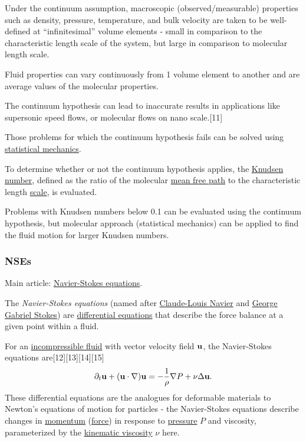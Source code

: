 \documentclass{article}
\begin{document}
Under the continuum assumption, macroscopic (observed/measurable) properties such as density, pressure, temperature, and bulk velocity are taken to be well-defined at ``infinitesimal'' volume elements - small in comparison to the characteristic length scale of the system, but large in comparison to molecular length scale.

Fluid properties can vary continuously from 1 volume element to another and are average values of the molecular properties.

The continuum hypothesis can lead to inaccurate results in applications like supersonic speed flows, or molecular flows on nano scale.[11]

Those problems for which the continuum hypothesis fails can be solved using \href{https://en.wikipedia.org/wiki/Statistical_mechanics}{statistical mechanics}.

To determine whether or not the continuum hypothesis applies, the \href{https://en.wikipedia.org/wiki/Knudsen_number}{Knudsen number}, defined as the ratio of the molecular \href{https://en.wikipedia.org/wiki/Mean_free_path}{mean free path} to the characteristic length \href{https://en.wikipedia.org/wiki/Scale_(ratio)}{scale}, is evaluated.

Problems with Knudsen numbers below 0.1 can be evaluated using the continuum hypothesis, but molecular approach (statistical mechanics) can be applied to find the fluid motion for larger Knudsen numbers.

\subsubsection{NSEs}
Main article: \href{https://en.wikipedia.org/wiki/Navier-Stokes_equations}{Navier-Stokes equations}.

%
The \textit{Navier-Stokes equations} (named after \href{https://en.wikipedia.org/wiki/Claude-Louis_Navier}{Claude-Louis Navier} and \href{https://en.wikipedia.org/wiki/George_Gabriel_Stokes}{George Gabriel Stokes}) are \href{https://en.wikipedia.org/wiki/Differential_equations}{differential equations} that describe the force balance at a given point within a fluid.

For an \href{https://en.wikipedia.org/wiki/Incompressible_fluid}{incompressible fluid} with vector velocity field ${\bf u}$, the Navier-Stokes equations are[12][13][14][15]
\begin{align*}
	\partial_t{\bf u} + ({\bf u}\cdot\nabla){\bf u} = -\frac{1}{\rho}\nabla P + \nu\Delta{\bf u}.
\end{align*}
These differential equations are the analogues for deformable materials to Newton's equations of motion for particles - the Navier-Stokes equations describe changes in \href{https://en.wikipedia.org/wiki/Momentum}{momentum} (\href{https://en.wikipedia.org/wiki/Force}{force}) in response to \href{https://en.wikipedia.org/wiki/Pressure}{pressure} $P$ and viscosity, parameterized by the \href{https://en.wikipedia.org/wiki/Kinematic_viscosity}{kinematic viscosity} $\nu$ here.
\end{document}
